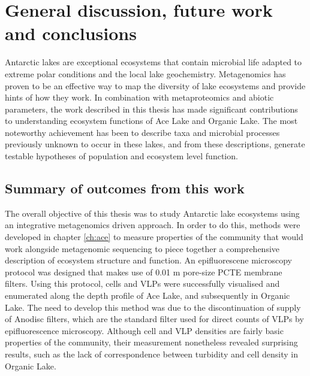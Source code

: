 \chapter{General discussion, future work and conclusions}
\label{ch:conc}
\acresetall

Antarctic lakes are exceptional ecosystems that contain microbial life adapted to extreme polar conditions and the local lake geochemistry.
Metagenomics has proven to be an effective way to map the diversity of lake ecosystems and provide hints of how they work.
In combination with metaproteomics and abiotic parameters, 
the work described in this thesis has made significant contributions to understanding ecosystem functions of Ace Lake and Organic Lake.
The most noteworthy achievement has been to describe taxa and microbial processes previously unknown to occur in these lakes, and from these descriptions, generate testable hypotheses of population and ecosystem level function.

\section{Summary of outcomes from this work}
The overall objective of this thesis was to study Antarctic lake ecosystems using an integrative metagenomics driven approach.
In order to do this, methods were developed in chapter \ref{ch:ace} to measure properties of the community that would work alongside metagenomic sequencing to piece together a comprehensive description of ecosystem structure and function.
An epifluorescene microscopy protocol was designed that makes use of 0.01 \textmu{}m pore-size \ac{PCTE} membrane filters.
Using this protocol, cells and \acp{VLP} were successfully visualised and enumerated along the depth profile of Ace Lake, and subsequently in Organic Lake.
The need to develop this method was due to the discontinuation of supply of Anodisc filters, which are the standard filter used for direct counts of \acp{VLP} by epifluorescence microscopy.
Although cell and \ac{VLP} densities are fairly basic properties of the community, their measurement nonetheless revealed surprising results, such as the lack of correspondence between turbidity and cell density in Organic Lake.

